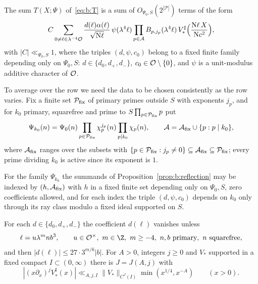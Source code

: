 \begin{proposition}\label{prop:b:reflection}
The sum $T(X;\Psi)$ of~\eqref{eq:b:T} is a sum of $O_{\Psi_0,S}(2^{|\mathcal P|})$ terms of the form
\begin{equation}\label{eq:b:reflection}
  C\sum_{0\ne\ell\in\lambda^{-4}\mathcal{O}}\frac{d(\ell)\alpha(\ell)}{\sqrt{\mathrm{N}\ell}}\,\psi(\lambda^4\ell)\prod_{p\in\mathcal A}B_{p,j_p}(\lambda^4\ell)\,V_*^\sharp\Bigl(\frac{\mathrm{N}\ell\,X}{\mathrm{N} c^2}\Bigr),
\end{equation}
with $|C|\ll_{\Psi_0,S}1$, where the triples $(d,\psi,c_0)$ belong to a fixed finite family depending only on $\Psi_0,S$: $d\in\{d_0,d_+,d_-\}$, $c_0\in\mathcal{O}\setminus\{0\}$, and $\psi$ is a unit-modulus additive character of $\mathcal{O}$.
\end{proposition}

To average over the row we need the data to be chosen consistently as the row varies. Fix a finite set $\mathcal P_{\rm fix}$ of primary primes outside $S$ with exponents $j_p$, and for $k_0$ primary, squarefree and prime to $S\prod_{p\in\mathcal P_{\rm fix}}p$ put
\[
  \Psi_{k_0}(n)=\Psi_0(n)\prod_{p\in\mathcal P_{\rm fix}}\chi_p^{j_p}(n)\prod_{p\mid k_0}\chi_p(n),\qquad\mathcal A=\mathcal A_{\rm fix}\cup\{p:p\mid k_0\},
\]
where $\mathcal A_{\rm fix}$ ranges over the subsets with $\{p\in\mathcal P_{\rm fix}:j_p\ne0\}\subseteq\mathcal A_{\rm fix}\subseteq\mathcal P_{\rm fix}$; every prime dividing $k_0$ is active since its exponent is $1$.

\begin{lemma}\label{lem:b:uniformity}
For the family $\Psi_{k_0}$ the summands of Proposition~\ref{prop:b:reflection} may be indexed by $(h,\mathcal A_{\rm fix})$ with $h$ in a fixed finite set depending only on $\Psi_0,S$, zero coefficients allowed, and for each index the triple $(d,\psi,c_0)$ depends on $k_0$ only through its ray class modulo a fixed ideal supported on $S$.
\end{lemma}

\begin{lemma}\label{lem:b:thetabounds}
For each $d\in\{d_0,d_+,d_-\}$ the coefficient $d(\ell)$ vanishes unless
\begin{equation}\label{eq:b:thetasupport}
  \ell=u\lambda^mnb^3,\qquad u\in\OO^\times,\ m\in\Z,\ m\ge-4,\ n,b\ \text{primary},\ n\ \text{squarefree},
\end{equation}
and then $|d(\ell)|\le27\cdot3^{m/6}|b|$. For $A>0$, integers $j\ge0$ and $V_*$ supported in a fixed compact $I\subset(0,\infty)$ there is $J=J(A,j)$ with
\begin{equation}\label{eq:b:weightdecay}
  |(x\partial_x)^jV_*^\sharp(x)|\ll_{A,j,I}\|V_*\|_{C^J(I)}\min(x^{1/4},x^{-A})\qquad(x>0).
\end{equation}
\end{lemma}

